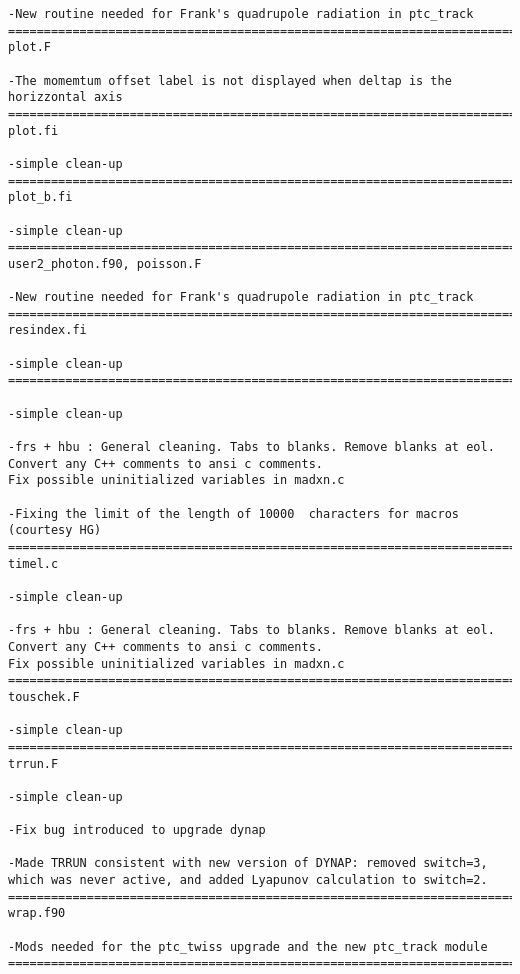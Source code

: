 \begin{verbatim}
-New routine needed for Frank's quadrupole radiation in ptc_track
=============================================================================
plot.F

-The momemtum offset label is not displayed when deltap is the horizzontal axis
=============================================================================
plot.fi

-simple clean-up
=============================================================================
plot_b.fi

-simple clean-up
=============================================================================
user2_photon.f90, poisson.F

-New routine needed for Frank's quadrupole radiation in ptc_track
=============================================================================
resindex.fi

-simple clean-up
=============================================================================

-simple clean-up

-frs + hbu : General cleaning. Tabs to blanks. Remove blanks at eol.
Convert any C++ comments to ansi c comments.
Fix possible uninitialized variables in madxn.c

-Fixing the limit of the length of 10000  characters for macros (courtesy HG)
=============================================================================
timel.c

-simple clean-up

-frs + hbu : General cleaning. Tabs to blanks. Remove blanks at eol.
Convert any C++ comments to ansi c comments.
Fix possible uninitialized variables in madxn.c
=============================================================================
touschek.F

-simple clean-up
=============================================================================
trrun.F

-simple clean-up

-Fix bug introduced to upgrade dynap

-Made TRRUN consistent with new version of DYNAP: removed switch=3, which was never active, and added Lyapunov calculation to switch=2.
=============================================================================
wrap.f90

-Mods needed for the ptc_twiss upgrade and the new ptc_track module
=============================================================================







\end{verbatim}
